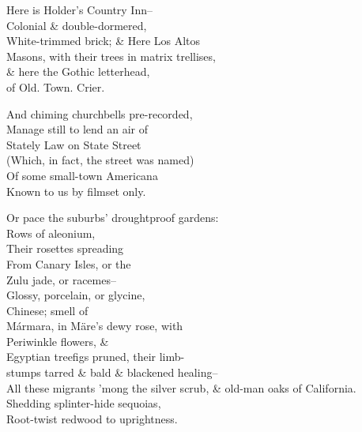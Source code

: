 Here is Holder's Country Inn-- \\
Colonial \& double-dormered, \\
White-trimmed brick; \& Here Los Altos \\
Masons, with their trees in matrix trellises, \\
\& here the Gothic letterhead, \\ 
of Old. Town. Crier.

And chiming churchbells pre-recorded, \\
Manage still to lend an air of \\
Stately Law on State Street \\
(Which, in fact, the street was named) \\
Of some small-town Americana \\
Known to us by filmset only.

\secdiv

Or pace the suburbs' droughtproof gardens: \\
Rows of aleonium, \\
Their rosettes spreading \\
From Canary Isles, or the \\
Zulu jade, or racemes-- \\
Glossy, porcelain, or glycine, \\
Chinese; smell of \\
Mármara, in Märe's dewy rose, with \\
Periwinkle flowers, \& \\
Egyptian treefigs pruned, their limb- \\
stumps tarred \& bald \& blackened healing-- \\
All these migrants 'mong the silver scrub,
\& old-man oaks of California. \\
Shedding splinter-hide sequoias, \\
Root-twist redwood to uprightness.


